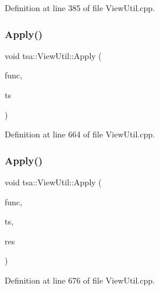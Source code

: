 Definition at line 385 of file View\+Util.\+cpp.

\mbox{\label{classtsa_1_1_view_util_afeeb25836288a1f484cb2ea6968b19dc}} 
\subsubsection{\texorpdfstring{Apply()}{Apply()}\hspace{0.1cm}{\footnotesize\ttfamily [1/4]}}
{\footnotesize\ttfamily void tsa\+::\+View\+Util\+::\+Apply (\begin{DoxyParamCaption}\item[{double($\ast$)(double)}]{func,  }\item[{\hyperlink{namespacetsa_ac599574bcc094eda25613724b8f3ca9e}{Seq\+View\+Double} \&}]{ts }\end{DoxyParamCaption})\hspace{0.3cm}{\ttfamily [static]}}



Definition at line 664 of file View\+Util.\+cpp.

\mbox{\label{classtsa_1_1_view_util_a23f737c5807ed1972d1855e02008bc68}} 
\subsubsection{\texorpdfstring{Apply()}{Apply()}\hspace{0.1cm}{\footnotesize\ttfamily [2/4]}}
{\footnotesize\ttfamily void tsa\+::\+View\+Util\+::\+Apply (\begin{DoxyParamCaption}\item[{double($\ast$)(double)}]{func,  }\item[{\hyperlink{namespacetsa_ac599574bcc094eda25613724b8f3ca9e}{Seq\+View\+Double} \&}]{ts,  }\item[{\hyperlink{namespacetsa_ac599574bcc094eda25613724b8f3ca9e}{Seq\+View\+Double} \&}]{res }\end{DoxyParamCaption})\hspace{0.3cm}{\ttfamily [static]}}



Definition at line 676 of file View\+Util.\+cpp.

